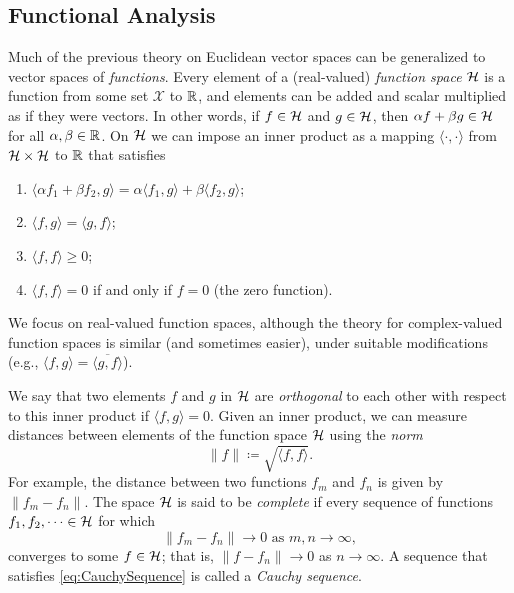 \subsection{Functional Analysis}
Much of the previous theory on Euclidean vector spaces can be generalized to vector spaces of \textit{functions}. Every element of a (real-valued) \textit{function space} \(\mathcal{H}\) is a function from some set \(\mathcal{X}\) to \(\mathbb{R}\), and elements can be added and scalar multiplied as if they were vectors. In other words, if \(f \in \mathcal{H}\) and \(g \in \mathcal{H}\), then \(\alpha f + \beta g \in \mathcal{H}\) for all \(\alpha, \beta \in \mathbb{R}\). On \(\mathcal{H}\) we can impose an inner product as a mapping \(\langle \cdot, \cdot \rangle\) from \(\mathcal{H} \times \mathcal{H}\) to \(\mathbb{R}\) that satisfies
\begin{enumerate}
	\item \(\langle \alpha f_1 + \beta f_2, g \rangle = \alpha \langle f_1, g \rangle + \beta \langle f_2, g \rangle\);
	\item \(\langle f, g \rangle = \langle g, f \rangle\);
	\item \(\langle f, f \rangle \ge 0\);
	\item \(\langle f, f \rangle = 0\) if and only if \(f = 0\) (the zero function).
\end{enumerate}
We focus on real-valued function spaces, although the theory for complex-valued function spaces is similar (and sometimes easier), under suitable modifications (e.g., \(\langle f, g \rangle = \overline{\langle g, f \rangle}\)).

We say that two elements \(f\) and \(g\) in \(\mathcal{H}\) are \textit{orthogonal} to each other with respect to this inner product if \(\langle f, g \rangle = 0\). Given an inner product, we can measure distances between elements of the function space \(\mathcal{H}\) using the \textit{norm}
\begin{equation*}
	\|f\| \coloneqq \sqrt{\langle f, f \rangle}.
\end{equation*}
For example, the distance between two functions \(f_m\) and \(f_n\) is given by \(\|f_m - f_n\|\). The space \(\mathcal{H}\) is said to be \textit{complete} if every sequence of functions \(f_1, f_2, \dots \in \mathcal{H}\) for which
\begin{equation}
	\|f_m - f_n\| \to 0 \text{ as } m, n \to \infty, \label{eq:CauchySequence}
\end{equation}
converges to some \(f \in \mathcal{H}\); that is, \(\|f - f_n\| \to 0\) as \(n \to \infty\). A sequence that satisfies \eqref{eq:CauchySequence} is called a \textit{Cauchy sequence}.

